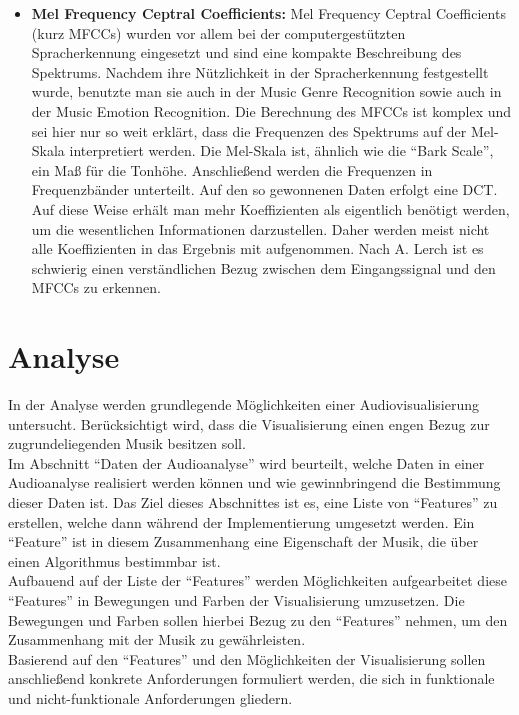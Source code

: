 \documentclass[11pt,a4paper]{article}
\begin{document}
\begin{itemize}
\item \textbf{Mel Frequency Ceptral Coefficients:} Mel Frequency Ceptral Coefficients (kurz MFCCs) wurden vor allem bei der computergestützten Spracherkennung eingesetzt und sind eine kompakte Beschreibung des Spektrums. Nachdem ihre Nützlichkeit in der Spracherkennung festgestellt wurde, benutzte man sie auch in der Music Genre Recognition sowie auch in der Music Emotion Recognition. Die Berechnung des MFCCs ist komplex und sei hier nur so weit erklärt, dass die Frequenzen des Spektrums auf der Mel-Skala interpretiert werden. Die Mel-Skala ist, ähnlich wie die ``Bark Scale'', ein Maß für die Tonhöhe. Anschließend werden die Frequenzen in Frequenzbänder unterteilt. Auf den so gewonnenen Daten erfolgt eine DCT. Auf diese Weise erhält man mehr Koeffizienten als eigentlich benötigt werden, um die wesentlichen Informationen darzustellen. Daher werden meist nicht alle Koeffizienten in das Ergebnis mit aufgenommen. Nach A. Lerch \cite[S. 51 ff.]{lerch2012introduction} ist es schwierig einen verständlichen Bezug zwischen dem Eingangssignal und den MFCCs zu erkennen.
\end{itemize}

\newpage

\section{Analyse}
In der Analyse werden grundlegende Möglichkeiten einer Audiovisualisierung untersucht. Berücksichtigt wird, dass die Visualisierung einen engen Bezug zur zugrundeliegenden Musik besitzen soll.\\
Im Abschnitt ``Daten der Audioanalyse'' wird beurteilt, welche Daten in einer Audioanalyse realisiert werden können und wie gewinnbringend die Bestimmung dieser Daten ist. Das Ziel dieses Abschnittes ist es, eine Liste von ``Features'' zu erstellen, welche dann während der Implementierung umgesetzt werden. Ein ``Feature'' ist in diesem Zusammenhang eine Eigenschaft der Musik, die über einen Algorithmus bestimmbar ist.\\
Aufbauend auf der Liste der ``Features'' werden Möglichkeiten aufgearbeitet diese ``Features'' in Bewegungen und Farben der Visualisierung umzusetzen. Die Bewegungen und Farben sollen hierbei Bezug zu den ``Features'' nehmen, um den Zusammenhang mit der Musik zu gewährleisten.\\
Basierend auf den ``Features'' und den Möglichkeiten der Visualisierung sollen anschließend konkrete Anforderungen formuliert werden, die sich in funktionale und nicht-funktionale Anforderungen gliedern.
\end{document}
